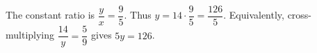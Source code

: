 The constant ratio is $\dfrac{y}{x}=\dfrac{9}{5}$. Thus $y=14\cdot\dfrac{9}{5}=\boxed{\dfrac{126}{5}}$. Equivalently, cross-multiplying $\dfrac{14}{y}=\dfrac{5}{9}$ gives $5y=126$.
